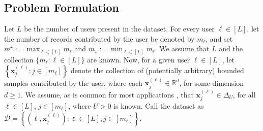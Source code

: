 \documentclass[conference,letterpaper]{IEEEtran}
\theoremstyle{remark}
\theoremstyle{definition}
\begin{document}



\subsection{Problem Formulation}
\label{sec:problem}
Let $L$ be the number of users present in the dataset. For every user $\ell\in [L]$, let the number of records contributed by the user be denoted by $m_\ell$, and set $m^\star:= \max_{\ell\in [L]} m_\ell$ and $m_\star:= \min_{\ell\in [L]} m_\ell$. We assume that $L$ and the collection $\{m_\ell: \ell \in [L]\}$ are known. Now, for a given user $\ell\in [L]$, let $\left\{\mathbf{x}_j^{(\ell)}: j\in [m_\ell]\right\}$ denote the collection of (potentially arbitrary) bounded samples contributed by the user, where each $\mathbf{x}_j^{(\ell)}\in \mathbb{R}^d$, for some dimension $d\geq 1$. We assume, as is common for most applications \cite{dpsgd,dp_spcom}, that {$ \mathbf{x}_j^{(\ell)} \in \Delta_U$}, for all $\ell\in [L]$, $j\in [m_\ell]$, where $U> 0$ is known. Call the dataset as $\mathcal{D} = \left\{\left(\ell,\mathbf{x}_j^{(\ell)}\right): \ell \in [L], j\in [m_\ell]\right\}$.  
\end{document}
